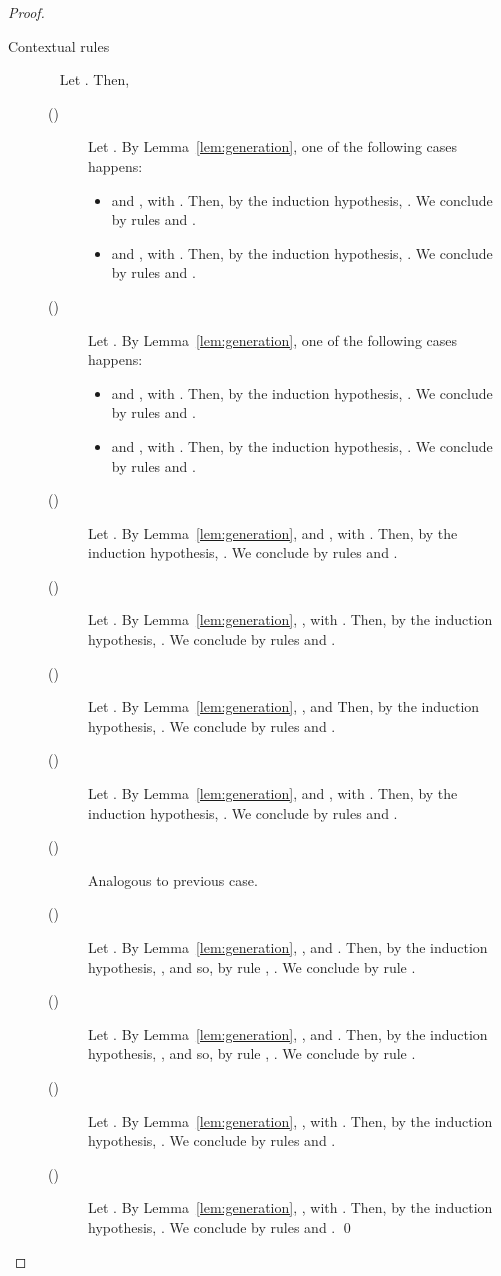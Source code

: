 \documentclass[preprint]{elsarticle}
\begin{document}
\begin{proof}
\begin{description}
  \item[Contextual rules]~ Let . Then,
    \begin{description}
    \item[()] Let . By Lemma~\ref{lem:generation}, one
      of the following cases happens:
      \begin{itemize}
      \item  and , with .
        Then, by the induction hypothesis, . We
        conclude by rules  and .
      \item  and , with
        . Then, by the induction hypothesis, . We conclude by rules  and
        .
      \end{itemize}
    \item[()] Let . By Lemma~\ref{lem:generation}, one of the following cases
      happens:
      \begin{itemize}
      \item  and , with
        . Then, by the induction hypothesis, . We
        conclude by rules  and .
      \item  and , with . Then, by the induction hypothesis,
        . We conclude by rules  and
        .
      \end{itemize}
    \item[()] Let . By
      Lemma~\ref{lem:generation},  and , with
      . Then, by the induction hypothesis, . We
      conclude by rules  and .
    \item[()] Let . By
      Lemma~\ref{lem:generation}, , with . Then,
      by the induction hypothesis, . We conclude by rules
       and .
    \item[()] Let . By
      Lemma~\ref{lem:generation}, , and  Then, by the induction hypothesis, . We conclude by rules  and .
    \item[()] Let . By
      Lemma~\ref{lem:generation},  and , with . Then, by the induction hypothesis, . We conclude
      by rules  and .
    \item[()] Analogous to previous case.
    \item[()] Let . By
      Lemma~\ref{lem:generation}, , and . Then, by the induction hypothesis, , and so, by rule , . We
      conclude by rule .
    \item[()] Let . By
      Lemma~\ref{lem:generation}, , and . Then, by the induction hypothesis, , and so, by rule , . We
      conclude by rule .
    \item[()] Let . By
      Lemma~\ref{lem:generation}, , with .
      Then, by the induction hypothesis, . We conclude by
      rules  and .
    \item[()] Let . By
      Lemma~\ref{lem:generation}, , with .
      Then, by the induction hypothesis, . We conclude by
      rules  and .
      \qed
    \end{description}
  \end{description}
\end{proof}
\end{document}

